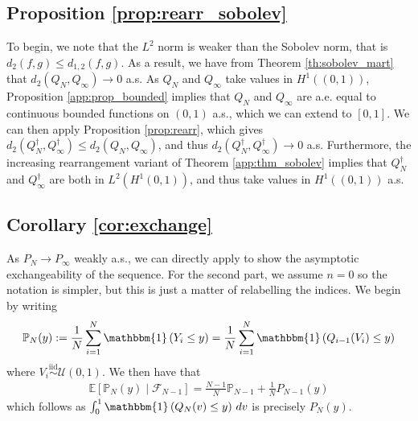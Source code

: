 \documentclass[11pt,a4paper]{article}
\newcommand{\iid}{\overset{\mathrm{iid}}{\sim}}
\newcommand{\E}{\mathbb{E}}
\begin{document}
\begin{appendices}
\subsection{Proposition \ref{prop:rearr_sobolev}}
To begin, we note that the $L^2$ norm is weaker than the Sobolev norm, that is $d_{2}(f, g) \leq  d_{1,2}(f, g)$. As a result, we have from {Theorem \ref{th:sobolev_mart}} that $d_2(Q_N, Q_\infty) \to 0$ a.s. As $Q_N$ and $Q_\infty$ take values in $H^1((0,1))$, {Proposition \ref{app:prop_bounded}} implies that $Q_N$ and $Q_\infty$ are a.e. equal to continuous bounded functions on $(0,1)$ a.s., which we can extend to $[0,1]$. We can then apply {Proposition \ref{prop:rearr}}, which gives 
    $d_2(Q_N^{\dagger}, Q_\infty^{\dagger}) \leq d_2(Q_N, Q_\infty)$, and thus
   $d_2(Q_N^{\dagger}, Q_\infty^{\dagger}) \to 0$ a.s.
Furthermore, the increasing rearrangement variant of {Theorem \ref{app:thm_sobolev}} implies that $Q_N^{\dagger}$ and $Q_\infty^{\dagger}$ are both in $L^2(H^1(0,1))$, and thus take values in $H^1((0,1))$ a.s.

\subsection{Corollary \ref{cor:exchange}}
As $P_N \to P_\infty$ weakly a.s., we can directly apply \citet[Lemma 8.2(b)]{Aldous1985} to show the asymptotic exchangeability of the sequence. For the second part, we assume $n = 0$ so the notation is simpler, but this is just a matter of relabelling the indices. We begin by writing
\begin{align*}
    \mathbb{P}_N(y) := \frac{1}{N}\sum_{i=1}^{N}\mathbbm{1}\left(Y_i \leq y\right)= \frac{1}{N}\sum_{i = 1}^{N} \mathbbm{1}\left(Q_{i-1}(V_i) \leq y\right)
\end{align*}
where $V_i \iid \mathcal{U}(0,1)$. We then have that
\begin{align*}
    \E[\mathbb{P}_N(y)\mid \mathcal{F}_{N-1}] = \frac{N-1}{N}\mathbb{P}_{N-1} + \frac{1}{N}P_{N-1}(y)
\end{align*}
which follows as $\int_0^1 \mathbbm{1}\left(Q_N(v) \leq y\right)\, dv$ is precisely $P_N(y)$. 


\end{appendices}
\end{document}
